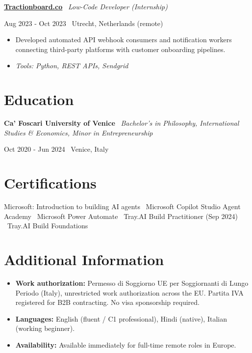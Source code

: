 \documentclass[a4paper,10pt]{article}
\newcommand{\role}[4]{%
  \vspace{2pt}\noindent
  \begin{minipage}[t]{0.70\textwidth}\raggedright\textbf{#1} \textbullet\ \textit{#3}\end{minipage}%
  \hfill
  \begin{minipage}[t]{0.28\textwidth}\raggedleft\footnotesize\color{gray}#2 \textbullet\ #4\end{minipage}%
  \vspace{1pt}%
}
\begin{document}
\role{\href{https://tractionboard.co}{Tractionboard.co}}{Aug 2023 - Oct 2023}{Low-Code Developer (Internship)}{Utrecht, Netherlands (remote)}
\begin{itemize}
  \item Developed automated API webhook consumers and notification workers connecting third-party platforms with customer onboarding pipelines.
  \item \textit{Tools: Python, REST APIs, Sendgrid}
\end{itemize}

\section{Education}
\role{Ca' Foscari University of Venice}{Oct 2020 - Jun 2024}{Bachelor's in Philosophy, International Studies \& Economics, Minor in Entrepreneurship}{Venice, Italy}

\section{Certifications}
Microsoft: Introduction to building AI agents \textbullet\ Microsoft Copilot Studio Agent Academy \textbullet\ Microsoft Power Automate \textbullet\ Tray.AI Build Practitioner (Sep 2024) \textbullet\ Tray.AI Build Foundations

\section{Additional Information}
\begin{itemize}
  \item \textbf{Work authorization:} Permesso di Soggiorno UE per Soggiornanti di Lungo Periodo (Italy), unrestricted work authorization across the EU. Partita IVA registered for B2B contracting. No visa sponsorship required.
  \item \textbf{Languages:} English (fluent / C1 professional), Hindi (native), Italian (working beginner).
  \item \textbf{Availability:} Available immediately for full-time remote roles in Europe.
\end{itemize}

\end{document}
